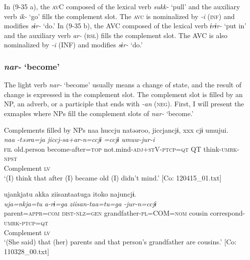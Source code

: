 In (9-35 a), the \textsc{av}C composed of the lexical verb \textit{sukk-} ‘pull’ and the auxiliary verb \textit{ik-} ‘go’ fills the complement slot. The \textsc{avc} is nominalized by \textit{{}-i} (\textsc{inf}) and modifies \textit{sɨr-} ‘do.’ In (9-35 b), the AVC composed of the lexical verb \textit{ɨrɨr-} ‘put in’ and the auxiliary verb \textit{ar-} (\textsc{rsl}) fills the complement slot. The AVC is also nominalized by \textit{{}-i} (INF) and modifies \textit{sɨr-} ‘do.’

\subsubsection{\textit{nar-} ‘become’}\label{sec:9.1.2.2}

The light verb \textit{nar-} ‘become’ usually means a change of state, and the result of change is expressed in the complement slot. The complement slot is filled by an NP, an adverb, or a participle that ends with \textit{{}-an} (\textsc{neg}). First, I will present the exmaples where NPs fill the complement slots of \textit{nar-} ‘become.’

\ea   Complements filled by NPs \label{ex:9.36}
\ea %
 \gllll  naa  huccju  natəəroo,  jiccjancjɨ,                                       xxx  cjɨ  umujui.  \\
      \textit{naa}  \textit{}  \textit{-təəra=ja  jiccj-sa+ar-n=ccjɨ}             \textit{=ccjɨ}  \textit{umuw-jur-i}  \\
      \textsc{fil}  old.person  become-after=\textsc{top}  not.mind-\textsc{adj}+\textsc{st}V-\textsc{ptcp}=\textsc{qt}                            QT  think-\textsc{umrk}-\textsc{npst}  \\
        Complement  \textsc{lv}  \\
      \glt       ‘(I) think that after (I) became old (I) didn’t mind.’ [Co: 120415\_01.txt]

\ex \label{ex:9.36b} %
    \gllll  ujankjatu  akka  ziisantaatuga    {\textbar}itoko{\textbar}  najuncjɨ.\\
      \textit{uja=nkja=tu}  \textit{a-rɨ=ga}  \textit{ziisan-taa=tu=ga}   \textit{}  \textit{-jur-n=ccjɨ}\\
      parent=\textsc{appr}=\textsc{com}  \textsc{dist}-\textsc{nlz}=\textsc{gen}  grandfather-\textsc{pl}=COM=\textsc{nom}  cousin  correspond-\textsc{umrk}-\textsc{ptcp}=\textsc{qt}\\
                                                             Complement  \textsc{lv}\\
      \glt       ‘(She said) that (her) parents and that person’s grandfather are cousins.’ [Co: 110328\_00.txt]


